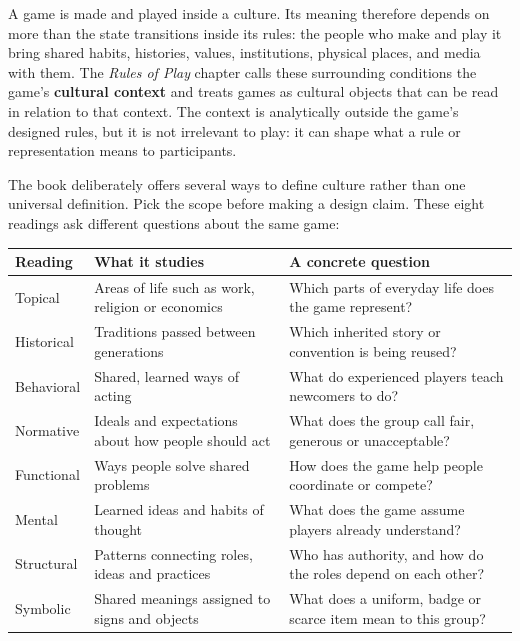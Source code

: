 A game is made and played inside a culture. Its meaning therefore depends on more than the state transitions inside its rules: the people who make and play it bring shared habits, histories, values, institutions, physical places, and media with them. The \emph{Rules of Play} chapter calls these surrounding conditions the game's \textbf{cultural context} and treats games as cultural objects that can be read in relation to that context. The context is analytically outside the game's designed rules, but it is not irrelevant to play: it can shape what a rule or representation means to participants.

The book deliberately offers several ways to define culture rather than one universal definition. Pick the scope before making a design claim. These eight readings ask different questions about the same game:

{\def\LTcaptype{none} %
\begin{longtable}[]{@{}
  >{\raggedright\arraybackslash}p{}
  >{\raggedright\arraybackslash}p{}
  >{\raggedright\arraybackslash}p{}@{}}
\toprule\noalign{}
\begin{minipage}[b]{\linewidth}\raggedright
Reading
\end{minipage} & \begin{minipage}[b]{\linewidth}\raggedright
What it studies
\end{minipage} & \begin{minipage}[b]{\linewidth}\raggedright
A concrete question
\end{minipage} \\
\midrule\noalign{}
\endhead
\bottomrule\noalign{}
\endlastfoot
Topical & Areas of life such as work, religion or economics & Which parts of everyday life does the game represent? \\
Historical & Traditions passed between generations & Which inherited story or convention is being reused? \\
Behavioral & Shared, learned ways of acting & What do experienced players teach newcomers to do? \\
Normative & Ideals and expectations about how people should act & What does the group call fair, generous or unacceptable? \\
Functional & Ways people solve shared problems & How does the game help people coordinate or compete? \\
Mental & Learned ideas and habits of thought & What does the game assume players already understand? \\
Structural & Patterns connecting roles, ideas and practices & Who has authority, and how do the roles depend on each other? \\
Symbolic & Shared meanings assigned to signs and objects & What does a uniform, badge or scarce item mean to this group? \\
\end{longtable}
}

